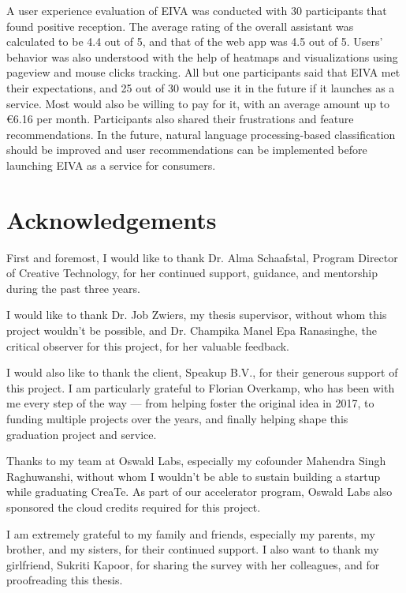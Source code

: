 \documentclass{article}
\begin{document}
A user experience evaluation of EIVA was conducted with 30 participants that found positive reception. The average rating of the overall assistant was calculated to be 4.4 out of 5, and that of the web app was 4.5 out of 5. Users' behavior was also understood with the help of heatmaps and visualizations using pageview and mouse clicks tracking. All but one participants said that EIVA met their expectations, and 25 out of 30 would use it in the future if it launches as a service. Most would also be willing to pay for it, with an average amount up to €6.16 per month. Participants also shared their frustrations and feature recommendations. In the future, natural language processing-based classification should be improved and user recommendations can be implemented before launching EIVA as a service for consumers.

\newpage

\section*{Acknowledgements}

First and foremost, I would like to thank Dr. Alma Schaafstal, Program Director of Creative Technology, for her continued support, guidance, and mentorship during the past three years.

I would like to thank Dr. Job Zwiers, my thesis supervisor, without whom this project wouldn't be possible, and Dr. Champika Manel Epa Ranasinghe, the critical observer for this project, for her valuable feedback.

I would also like to thank the client, Speakup B.V., for their generous support of this project. I am particularly grateful to Florian Overkamp, who has been with me every step of the way --- from helping foster the original idea in 2017, to funding multiple projects over the years, and finally helping shape this graduation project and service.

Thanks to my team at Oswald Labs, especially my cofounder Mahendra Singh Raghuwanshi, without whom I wouldn't be able to sustain building a startup while graduating CreaTe. As part of our accelerator program, Oswald Labs also sponsored the cloud credits required for this project.

I am extremely grateful to my family and friends, especially my parents, my brother, and my sisters, for their continued support. I also want to thank my girlfriend, Sukriti Kapoor, for sharing the survey with her colleagues, and for proofreading this thesis.
\end{document}
